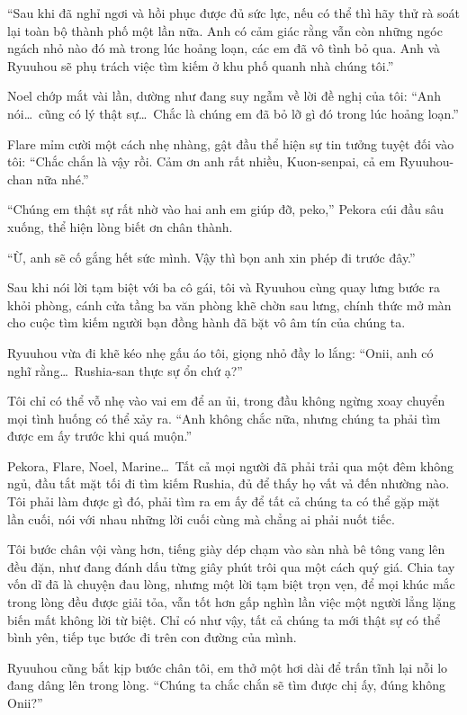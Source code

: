 \documentclass[../main.tex]{subfiles}
\begin{document}
``Sau khi đã nghỉ ngơi và hồi phục được đủ sức lực, nếu có thể thì hãy thử rà soát lại toàn bộ thành phố một lần nữa. Anh có cảm giác rằng vẫn còn những ngóc ngách nhỏ nào đó mà trong lúc hoảng loạn, các em đã vô tình bỏ qua. Anh và Ryuuhou sẽ phụ trách việc tìm kiếm ở khu phố quanh nhà chúng tôi.''

Noel chớp mắt vài lần, dường như đang suy ngẫm về lời đề nghị của tôi: ``Anh nói\dots\ cũng có lý thật sự\dots\ Chắc là chúng em đã bỏ lỡ gì đó trong lúc hoảng loạn.''

Flare mỉm cười một cách nhẹ nhàng, gật đầu thể hiện sự tin tưởng tuyệt đối vào tôi: ``Chắc chắn là vậy rồi. Cảm ơn anh rất nhiều, Kuon-senpai, cả em Ryuuhou-chan nữa nhé.''

``Chúng em thật sự rất nhờ vào hai anh em giúp đỡ, peko,'' Pekora cúi đầu sâu xuống, thể hiện lòng biết ơn chân thành.

``Ừ, anh sẽ cố gắng hết sức mình. Vậy thì bọn anh xin phép đi trước đây.''

Sau khi nói lời tạm biệt với ba cô gái, tôi và Ryuuhou cùng quay lưng bước ra khỏi phòng, cánh cửa tầng ba văn phòng khẽ chờn sau lưng, chính thức mở màn cho cuộc tìm kiếm người bạn đồng hành đã bặt vô âm tín của chúng ta.

Ryuuhou vừa đi khẽ kéo nhẹ gấu áo tôi, giọng nhỏ đầy lo lắng: ``Onii, anh có nghĩ rằng\dots\ Rushia-san thực sự ổn chứ ạ?''

Tôi chỉ có thể vỗ nhẹ vào vai em để an ủi, trong đầu không ngừng xoay chuyển mọi tình huống có thể xảy ra. ``Anh không chắc nữa, nhưng chúng ta phải tìm được em ấy trước khi quá muộn.''

Pekora, Flare, Noel, Marine\dots\ Tất cả mọi người đã phải trải qua một đêm không ngủ, đầu tắt mặt tối đi tìm kiếm Rushia, đủ để thấy họ vất vả đến nhường nào. Tôi phải làm được gì đó, phải tìm ra em ấy để tất cả chúng ta có thể gặp mặt lần cuối, nói với nhau những lời cuối cùng mà chẳng ai phải nuốt tiếc.

Tôi bước chân vội vàng hơn, tiếng giày dép chạm vào sàn nhà bê tông vang lên đều đặn, như đang đánh dấu từng giây phút trôi qua một cách quý giá. Chia tay vốn dĩ đã là chuyện đau lòng, nhưng một lời tạm biệt trọn vẹn, để mọi khúc mắc trong lòng đều được giải tỏa, vẫn tốt hơn gấp nghìn lần việc một người lẳng lặng biến mất không lời từ biệt. Chỉ có như vậy, tất cả chúng ta mới thật sự có thể bình yên, tiếp tục bước đi trên con đường của mình.

Ryuuhou cũng bắt kịp bước chân tôi, em thở một hơi dài để trấn tĩnh lại nỗi lo đang dâng lên trong lòng. ``Chúng ta chắc chắn sẽ tìm được chị ấy, đúng không Onii?''
\end{document}
